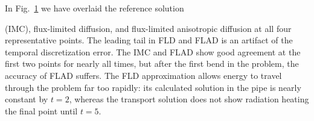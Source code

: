 In Fig.~\ref{fig:doglegFiducialAll} we have overlaid the reference solution
%
\begin{figure}[htb]
  \centering\small
  \hspace{-.25in}%
  
  \label{fig:doglegFiducialAll}
\end{figure}
%
(IMC), flux-limited diffusion, and flux-limited anisotropic diffusion at all
four representative points. The leading tail in FLD and FLAD is an artifact of
the temporal discretization error. The IMC and FLAD show good agreement at the
first two points for nearly all times, but after the first bend in the problem,
the accuracy of FLAD suffers. The FLD approximation allows energy to travel
through the problem far too rapidly: its calculated solution in the pipe is
nearly constant by $t=2$, whereas the transport solution does not show radiation
heating the final point until $t=5$.

